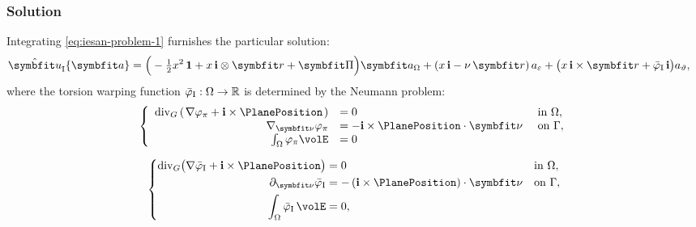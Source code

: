 \subsubsection*{Solution}
Integrating \eqref{eq:iesan-problem-1} furnishes the particular solution:
\begin{equation}
\begin{aligned}
\hat{\bm u}_{\rm I}\{\bm a\}
&=\Big(-\tfrac12 \reflenx^2\,\mathbf{1}
+\reflenx\,\FrameBasis\otimes\bm{r}
+\PlaneShape
\Big)\bm{a}_{\Section}
+(\reflenx\,\FrameBasis-\nu\,\bm{r})\,a_{\varepsilon}
+\big(\reflenx\,\FrameBasis\times\bm{r}+\WarpTwistIesan\,\FrameBasis\big)a_\vartheta ,
\end{aligned}
\label{eq:iesan-displacement-1}
\end{equation}
where the torsion warping function \(\bar{\varphi}_{\rm I}:\Omega\rightarrow\mathbb{R}\) is determined by the Neumann problem:
\begin{equation}
\left\{
\begin{array}{rll}
\operatorname{div}_G\left(\left.\nabla \WarpSVP+\FrameBasis\times\PlanePosition\right.\right) &=0 & \text { in } \Section, \\
\nabla_{\bm{\nu}} \WarpSVP &=-\FrameBasis\times\PlanePosition \cdot \bm{\nu} & \text { on } \SectionBoundary, \\
\int_{\Section} \WarpSVP \volE &= 0
\end{array}
\right.
\label{eq:bvp-warp-twist-iesan}
\end{equation}
\begin{Details}
\begin{equation*}
\left\{
\begin{aligned}
\operatorname{div}_G\!\big(\nabla \WarpTwistIesan+\FrameBasis\times\PlanePosition\big)&=0 && \text{in }\Section,\\
\partial_{\bm{\nu}} \WarpTwistIesan&=-\,(\FrameBasis\times\PlanePosition)\cdot \bm{\nu} && \text{on } \SectionBoundary,\\
\int_{\Section} \WarpTwistIesan\, \volE&=0, &&
\end{aligned}
\right.
\end{equation*}
\end{Details}
